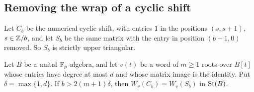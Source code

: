 \subsection{Removing the wrap of a cyclic shift}

Let $C_b$ be the numerical cyclic shift, with entries $1$ in the positions $(s,s+1)$, $s\in\mathbb Z/b$, and let $S_b$ be the
same matrix with the entry in position $(b-1,0)$ removed. So $S_b$ is strictly upper triangular.

\begin{lemma}\label{lem:tor-wrap}
Let $B$ be a unital $\mathbb F_p$-algebra, and let $v(t)$ be a word of $m\geq1$ roots over $B[t]$ whose entries have degree at
most $d$ and whose matrix image is the identity. Put $\delta=\max\{1,d\}$. If $b>2(m+1)\delta$, then
$W_v(C_b)=W_v(S_b)$ in $\operatorname{St}(B)$.
\end{lemma}

